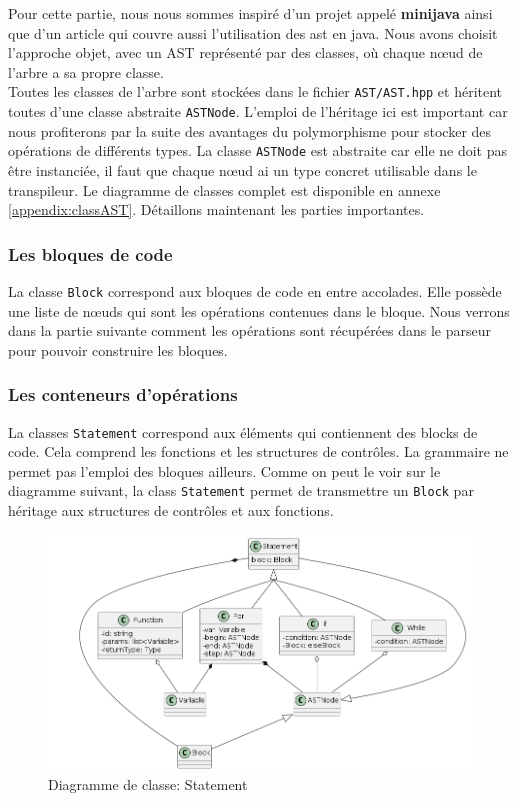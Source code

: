 \documentclass[a4paper]{article}%
\begin{document}
Pour cette partie, nous nous sommes inspiré d'un projet appelé \textbf{minijava}
\cite{minijava} ainsi que d'un article \cite{gagnon1998sablecc} qui couvre aussi
l'utilisation des \gls{ast} en java. Nous avons choisit l'approche objet, avec un AST
représenté par des classes, où chaque nœud de l'arbre a sa propre classe.\\

Toutes les classes de l'arbre sont stockées dans le fichier
\lstinline{AST/AST.hpp} et héritent toutes d'une classe abstraite
\lstinline{ASTNode}. L'emploi de l'héritage ici est important car
nous profiterons par la suite des avantages du polymorphisme pour stocker des
opérations de différents types. La classe \lstinline{ASTNode} est abstraite car
elle ne doit pas être instanciée, il faut que chaque nœud ai un type concret
utilisable dans le transpileur. Le diagramme de classes complet est disponible
en annexe \ref{appendix:classAST}. Détaillons maintenant les parties
importantes.

\subsubsection*{Les bloques de code}

La classe \lstinline{Block} correspond aux bloques de code en entre accolades.
Elle possède une liste de nœuds qui sont les opérations contenues dans le
bloque. Nous verrons dans la partie suivante comment les opérations sont
récupérées dans le parseur pour pouvoir construire les bloques.

\clearpage{}
\subsubsection*{Les conteneurs d'opérations}

La classes \lstinline{Statement} correspond aux éléments qui contiennent des
blocks de code. Cela comprend les fonctions et les structures de contrôles. La
grammaire ne permet pas l'emploi des bloques ailleurs. Comme on peut le voir sur
le diagramme suivant, la class \lstinline{Statement} permet de transmettre un
\lstinline{Block} par héritage aux structures de contrôles et aux fonctions.

\begin{figure}[h!]
  \begin{center}
  \includegraphics[scale=0.5]{../ressources/diagrams/stmts.png}
  \caption{Diagramme de classe: Statement}
  \end{center}
\end{figure}
\end{document}
